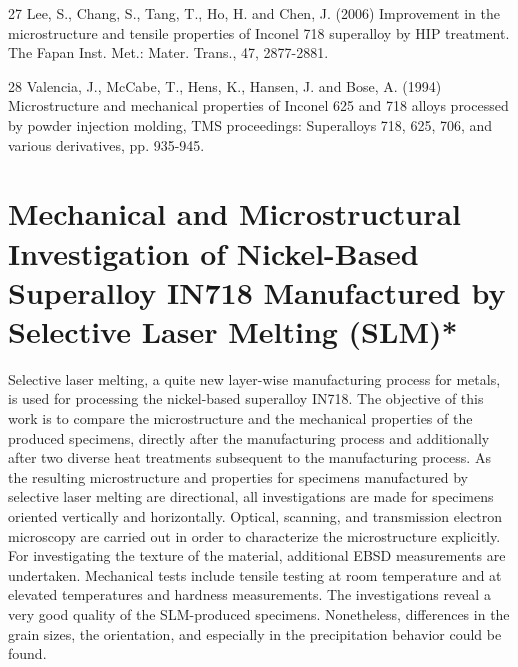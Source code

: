 \documentclass[10pt]{article}
\begin{document}
27 Lee, S., Chang, S., Tang, T., Ho, H. and Chen, J. (2006) Improvement in the microstructure and tensile properties of Inconel 718 superalloy by HIP treatment. The Fapan Inst. Met.: Mater. Trans., 47, 2877-2881.

28 Valencia, J., McCabe, T., Hens, K., Hansen, J. and Bose, A. (1994) Microstructure and mechanical properties of Inconel 625 and 718 alloys processed by powder injection molding, TMS proceedings: Superalloys 718, 625, 706, and various derivatives, pp. 935-945.

\section*{Mechanical and Microstructural Investigation of Nickel-Based Superalloy IN718 Manufactured by Selective Laser Melting (SLM)* }
Selective laser melting, a quite new layer-wise manufacturing process for metals, is used for processing the nickel-based superalloy IN718. The objective of this work is to compare the microstructure and the mechanical properties of the produced specimens, directly after the manufacturing process and additionally after two diverse heat treatments subsequent to the manufacturing process. As the resulting microstructure and properties for specimens manufactured by selective laser melting are directional, all investigations are made for specimens oriented vertically and horizontally. Optical, scanning, and transmission electron microscopy are carried out in order to characterize the microstructure explicitly. For investigating the texture of the material, additional EBSD measurements are undertaken. Mechanical tests include tensile testing at room temperature and at elevated temperatures and hardness measurements. The investigations reveal a very good quality of the SLM-produced specimens. Nonetheless, differences in the grain sizes, the orientation, and especially in the precipitation behavior could be found.
\end{document}
